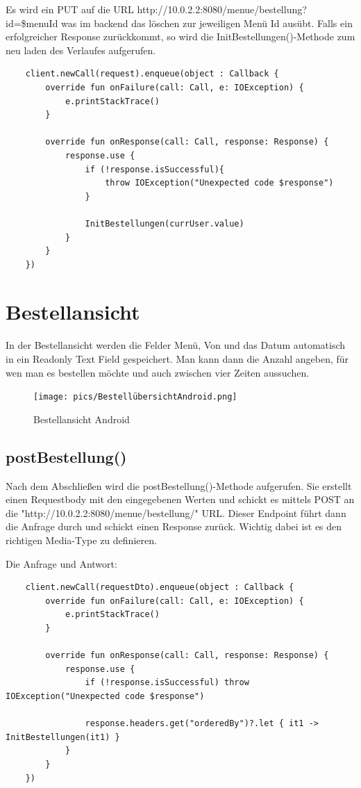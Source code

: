 Es wird ein PUT auf die URL http://10.0.2.2:8080/menue/bestellung?id=\$menuId was im backend das löschen zur jeweiligen Menü Id ausübt.
Falls ein erfolgreicher Response zurückkommt, so wird die InitBestellungen()-Methode zum neu laden des Verlaufes aufgerufen.

\begin{lstlisting}
    client.newCall(request).enqueue(object : Callback {
        override fun onFailure(call: Call, e: IOException) {
            e.printStackTrace()
        }

        override fun onResponse(call: Call, response: Response) {
            response.use {
                if (!response.isSuccessful){
                    throw IOException("Unexpected code $response")
                }

                InitBestellungen(currUser.value)
            }
        }
    })
\end{lstlisting}


\pagebreak


\section{Bestellansicht}

In der Bestellansicht werden die Felder Menü, Von und das Datum automatisch in ein Readonly Text Field gespeichert.
Man kann dann die Anzahl angeben, für wen man es bestellen möchte und auch zwischen vier Zeiten aussuchen. 

\begin{figure}[htp]
    \centering
    \author{Bozidar Spasenovic}
    \texttt{[image: pics/BestellübersichtAndroid.png]}
    \caption{Bestellansicht Android}
    \label{fig:impl:BestellübersichtAndroid}
\end{figure}

\subsection{postBestellung()}
Nach dem Abschließen wird die postBestellung()-Methode aufgerufen. Sie erstellt einen Requestbody mit den eingegebenen Werten
und schickt es mittels POST an die "http://10.0.2.2:8080/menue/bestellung/" URL. Dieser Endpoint führt dann die Anfrage durch und schickt einen Response zurück.
Wichtig dabei ist es den richtigen Media-Type zu definieren. 

Die Anfrage und Antwort:
\begin{lstlisting}
    client.newCall(requestDto).enqueue(object : Callback {
        override fun onFailure(call: Call, e: IOException) {
            e.printStackTrace()
        }

        override fun onResponse(call: Call, response: Response) {
            response.use {
                if (!response.isSuccessful) throw IOException("Unexpected code $response")

                response.headers.get("orderedBy")?.let { it1 -> InitBestellungen(it1) }
            }
        }
    })
\end{lstlisting}







